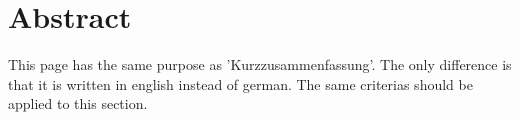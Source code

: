 \section*{Abstract}\label{sec:abstract}


This page has the same purpose as 'Kurzzusammenfassung'. The only difference is that it is written in english instead of german. The same criterias should be applied to this section.

\newpage